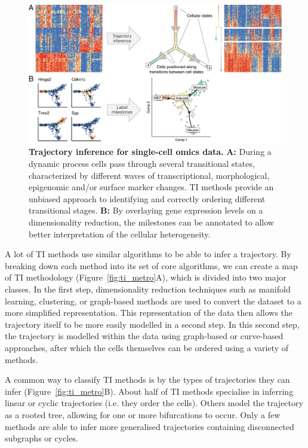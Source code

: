 \begin{figure}[htb!]
	\centering
	\includegraphics[width=.9\linewidth]{fig/comptools2/comptool_3_trajectoryinference.pdf} 
	\caption{
		\textbf{Trajectory inference for single-cell omics data.}
		\textbf{A:} During a dynamic process cells pass through several transitional states, characterized by different waves of transcriptional, morphological, epigenomic and/or surface marker changes\cite{enver_stemcellstates_2009}. TI methods provide an unbiased approach to identifying and correctly ordering different transitional stages. 
		\textbf{B:} By overlaying gene expression levels on a dimensionality reduction, the milestones can be annotated to allow better interpretation of the cellular heterogeneity.
	}
	\label{fig:comp_tools_ti}
\end{figure}

A lot of TI methods use similar algorithms to be able to infer a trajectory. By breaking down each method into its set of core algorithms, we can create a map of TI methodology\cite{cannoodt_computationalmethodstrajectory_2016} (Figure~\ref{fig:ti_metro}A), which is divided into two major classes.
In the first step, dimensionality reduction techniques such as manifold learning, clustering, or graph-based methods are used to convert the dataset to a more simplified representation. This representation of the data then allows the trajectory itself to be more easily modelled in a second step. In this second step, the trajectory is modelled within the data using graph-based or curve-based approaches, after which the cells themselves can be ordered using a variety of methods.

A common way to classify TI methods is by the types of trajectories they can infer\cite{saelens_comparisonsinglecelltrajectory_2019} (Figure~\ref{fig:ti_metro}B). About half of TI methods specialise in inferring linear or cyclic trajectories (i.e. they order the cells). Others model the trajectory as a rooted tree, allowing for one or more bifurcations to occur. Only a few methods are able to infer more generalised trajectories containing disconnected subgraphs or cycles.

